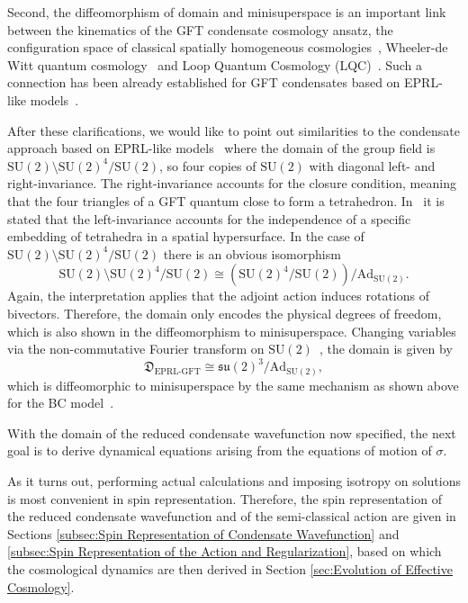 \documentclass[11pt,a4paper]{article}
\newcommand{\SU}{\text{SU$(2)$}}
\newcommand{\su}{\mathfrak{su}(2)}
\begin{document}
Second, the diffeomorphism of domain and minisuperspace is an important link between the kinematics of the GFT condensate cosmology ansatz, the configuration space of classical spatially homogeneous cosmologies~\cite{Ellis2012}, Wheeler-de Witt quantum cosmology~\cite{Kiefer2012,Hamber2009} and Loop Quantum Cosmology (LQC)~\cite{Bojowald2008,Ashtekar:2021kfp,Banerjee:2011qu}. Such a connection has been already established for GFT condensates based on EPRL-like models~\cite{Oriti:2016qtz,Gielen:2014ila,Gielen:2013naa}.

After these clarifications, we would like to point out similarities to the condensate approach based on EPRL-like models~\cite{Oriti:2016qtz, deCesare:2017ynn, Pithis:2019tvp, Gielen:2014ila, Oriti:2016acw} where the domain of the group field is $\SU\setminus\SU^4/\SU$, so four copies of $\SU$ with diagonal left- and right-invariance. The right-invariance accounts for the closure condition, meaning that the four triangles of a GFT quantum close to form a tetrahedron. In~\cite{Oriti:2016qtz} it is stated that the left-invariance accounts for the independence of a specific embedding of tetrahedra in a spatial hypersurface. In the case of $\SU\setminus\SU^4/\SU$ there is an obvious isomorphism
%
\begin{equation}
\SU\setminus\SU^4/\SU
\cong
 \left(\SU^4/\SU\right)/\text{Ad}_{\SU}.
\end{equation} 
%
Again, the interpretation applies that the adjoint action induces rotations of bivectors. Therefore, the domain only encodes the physical degrees of freedom, which is also shown in the diffeomorphism to minisuperspace. Changing variables via the non-commutative Fourier transform on $\SU$~\cite{Guedes:2013vi,Oriti:2018bwr}, the domain is given by
%
\begin{equation}
\mathfrak{D}_{\text{EPRL-GFT}}
\cong
\su^3/\text{Ad}_{\SU},
\end{equation}
%
which is diffeomorphic to minisuperspace by the same mechanism as shown above for the BC model~\cite{Gielen:2014ila}.

With the domain of the reduced condensate wavefunction now specified, the next goal is to derive dynamical equations arising from the equations of motion of $\sigma$. 

As it turns out, performing actual calculations and imposing isotropy on solutions is most convenient in spin representation. Therefore, the spin representation of the reduced condensate wavefunction and of the semi-classical action are given in Sections \ref{subsec:Spin Representation of Condensate Wavefunction} and \ref{subsec:Spin Representation of the Action and Regularization}, based on which the cosmological dynamics are then derived in Section \ref{sec:Evolution of Effective Cosmology}.
\end{document}
